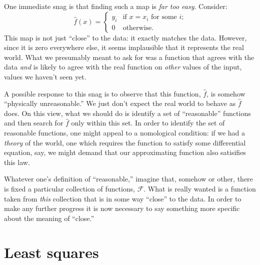 \documentclass[10pt, a4paper]{article}
\begin{document}
One immediate snag is that finding such a map is \emph{far too
  easy}. Consider:
\begin{equation*}
  \hat{f}(x) =
  \begin{cases}
    y_i & \text{if $x = x_i$ for some $i$;} \\
      0 & \text{otherwise}.
  \end{cases}
\end{equation*}
This map is not just “close” to the data: it exactly matches the
data. However, since it is zero everywhere else, it seems implausible
that it represents the real world. What we presumably meant to ask for
was a function that agrees with the data \emph{and} is likely to agree
with the real function on \emph{other} values of the input, values we
haven't seen yet.

A possible response to this snag is to observe that this function,
$\hat{f}$, is somehow “physically unreasonable.” We just don't expect
the real world to behave as $\hat{f}$ does. On this view, what we
should do is identify a set of “reasonable” functions and then search
for $\hat{f}$ only within this set. In order to identify the set of
reasonable functions, one might appeal to a nomological condition: if
we had a \emph{theory} of the world, one which requires the function
to satisfy some differential equation, say, we might demand that our
approximating function also satisifies this law.

Whatever one's definition of “reasonable,” imagine that, somehow or
other, there is fixed a particular collection of functions,
$\mathcal{F}$. What is really wanted is a function taken from \emph{this}
collection that is in some way “close” to the data. In order to make any
further progress it is now necessary to say something more specific
about the meaning of “close.”

\section{Least squares}
\end{document}
